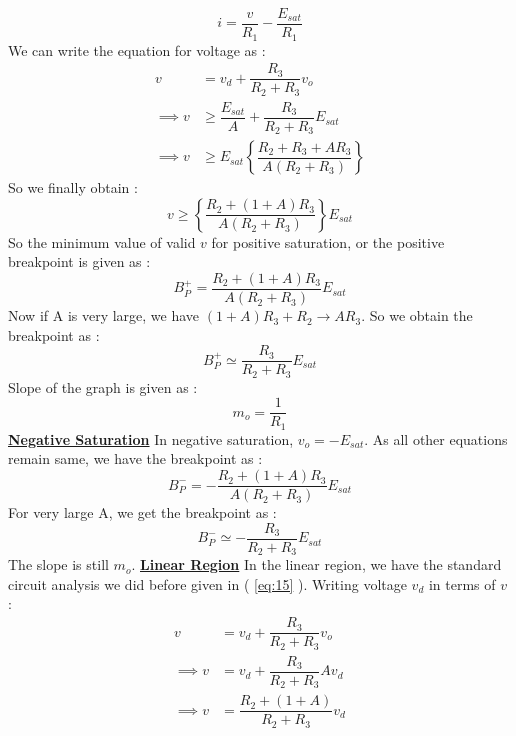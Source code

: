 \documentclass[12pt]{article}
\newcommand*{\myref}[1]{%
  \begingroup
    \hypersetup{
      linkcolor=linkequation,
      linkbordercolor=linkequation,
    }%
    \ref{#1}%
  \endgroup
}
\begin{document}
\begin{equation}
	i=\dfrac{v}{R_1}-\dfrac{E_{sat}}{R_1} \label{eq:17}
\end{equation}
We can write the equation for voltage as :
\begin{align*}
	v&= v_d+\dfrac{R_3}{R_2+R_3}v_o \\
	\implies v & \geq \dfrac{E_{sat}}{A}+\dfrac{R_3}{R_2+R_3}E_{sat} \\
	\implies v & \geq E_{sat}\left\{ \dfrac{R_2+R_3+AR_3}{A(R_2+R_3)} \right\}
\end{align*}
So we finally obtain :
\begin{equation}
	v \geq \left\{ \dfrac{R_2+(1+A)R_3}{A(R_2+R_3)} \right\} E_{sat} \label{eq:18}
\end{equation}
So the minimum value of valid $v$ for positive saturation, or the positive breakpoint is given as :
\begin{equation}
	B^+_P = \dfrac{R_2+(1+A)R_3}{A(R_2+R_3)} E_{sat} \label{eq:19}
\end{equation}
Now if A is very large, we have $(1+A)R_3+R_2 \longrightarrow AR_3$. So we obtain the breakpoint as :
\begin{equation}
	B^+_P \simeq \dfrac{R_3}{R_2+R_3}E_{sat} \label{eq:20}
\end{equation}
Slope of the graph is given as :
\begin{equation}
	m_o=\dfrac{1}{R_1} \label{eq:21}
\end{equation}
\textbf{\uline{Negative Saturation}} \linebreak %
In negative saturation, $v_o=-E_{sat}$. As all other equations remain same, we have the breakpoint as :
\begin{equation}
	B^-_P = - \dfrac{R_2+(1+A)R_3}{A(R_2+R_3)}E_{sat} \label{eq:22}
\end{equation}
For very large A, we get the breakpoint as :
\begin{equation}
	B^-_P \simeq -\dfrac{R_3}{R_2+R_3}E_{sat} \label{eq:23}
\end{equation}
The slope is still $m_o$. \linebreak
\textbf{\uline{Linear Region}} \linebreak %
In the linear region, we have the standard circuit analysis we did before given in (\myref{eq:15}). \linebreak
Writing voltage $v_d$ in terms of $v$ :
\begin{align*}
	v&=v_d+\dfrac{R_3}{R_2+R_3}v_o \\
	\implies v &= v_d+\dfrac{R_3}{R_2+R_3}Av_d \\
	\implies v&= \dfrac{R_2+(1+A)}{R_2+R_3} v_d 
\end{align*}
\end{document}

